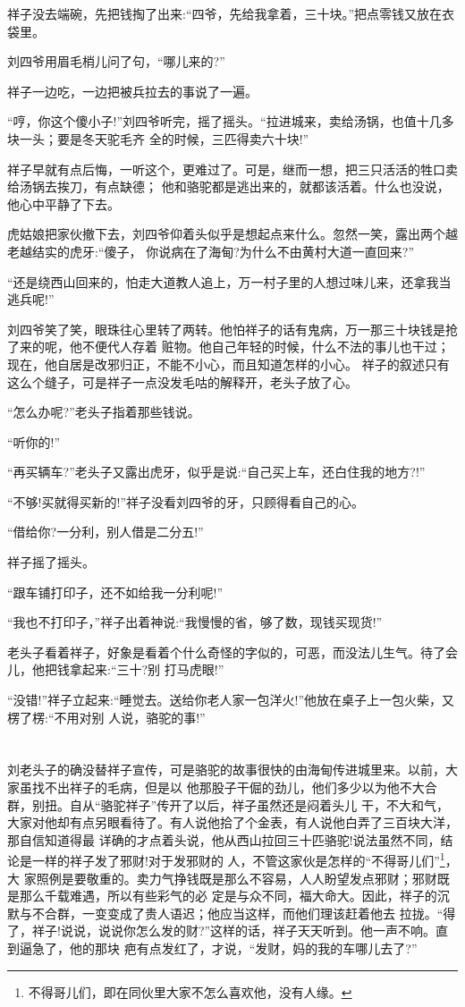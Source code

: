 \documentclass[11pt,a4paper,onecolumn]{article}
\begin{document}
祥子没去端碗，先把钱掏了出来:``四爷，先给我拿着，三十块。''把点零钱又放在衣袋里。

刘四爷用眉毛梢儿问了句，``哪儿来的?''

祥子一边吃，一边把被兵拉去的事说了一遍。

``哼，你这个傻小子!''刘四爷听完，摇了摇头。``拉进城来，卖给汤锅，也值十几多块一头；要是冬天驼毛齐
全的时候，三匹得卖六十块!''

祥子早就有点后悔，一听这个，更难过了。可是，继而一想，把三只活活的牲口卖给汤锅去挨刀，有点缺德；
他和骆驼都是逃出来的，就都该活着。什么也没说，他心中平静了下去。

虎姑娘把家伙撤下去，刘四爷仰着头似乎是想起点来什么。忽然一笑，露出两个越老越结实的虎牙:``傻子，
你说病在了海甸?为什么不由黄村大道一直回来?''

``还是绕西山回来的，怕走大道教人追上，万一村子里的人想过味儿来，还拿我当逃兵呢!''

刘四爷笑了笑，眼珠往心里转了两转。他怕祥子的话有鬼病，万一那三十块钱是抢了来的呢，他不便代人存着
赃物。他自己年轻的时候，什么不法的事儿也干过；现在，他自居是改邪归正，不能不小心，而且知道怎样的小心。
祥子的叙述只有这么个缝子，可是祥子一点没发毛咕的解释开，老头子放了心。

``怎么办呢?''老头子指着那些钱说。

``听你的!''

``再买辆车?''老头子又露出虎牙，似乎是说:``自己买上车，还白住我的地方?!''

``不够!买就得买新的!''祥子没看刘四爷的牙，只顾得看自己的心。

``借给你?一分利，别人借是二分五!''

祥子摇了摇头。

``跟车铺打印子，还不如给我一分利呢!''

``我也不打印子，''祥子出着神说:``我慢慢的省，够了数，现钱买现货!''

老头子看着祥子，好象是看着个什么奇怪的字似的，可恶，而没法儿生气。待了会儿，他把钱拿起来:``三十?别
打马虎眼!''

``没错!''祥子立起来:``睡觉去。送给你老人家一包洋火!''他放在桌子上一包火柴，又楞了楞:``不用对别
人说，骆驼的事!''


\pagebreak
\section{}

刘老头子的确没替祥子宣传，可是骆驼的故事很快的由海甸传进城里来。以前，大家虽找不出祥子的毛病，但是以
他那股子干倔的劲儿，他们多少以为他不大合群，别扭。自从``骆驼祥子''传开了以后，祥子虽然还是闷着头儿
干，不大和气，大家对他却有点另眼看待了。有人说他拾了个金表，有人说他白弄了三百块大洋，那自信知道得最
详确的才点着头说，他从西山拉回三十匹骆驼!说法虽然不同，结论是一样的\myrule 祥子发了邪财!对于发邪财的
人，不管这家伙是怎样的``不得哥儿们''\footnote{不得哥儿们，即在同伙里大家不怎么喜欢他，没有人缘。}，大
家照例是要敬重的。卖力气挣钱既是那么不容易，人人盼望发点邪财；邪财既是那么千载难遇，所以有些彩气的必
定是与众不同，福大命大。因此，祥子的沉默与不合群，一变变成了贵人语迟；他应当这样，而他们理该赶着他去
拉拢。``得了，祥子!说说，说说你怎么发的财?''这样的话，祥子天天听到。他一声不响。直到逼急了，他的那块
疤有点发红了，才说，``发财，妈的我的车哪儿去了?''
\end{document}
